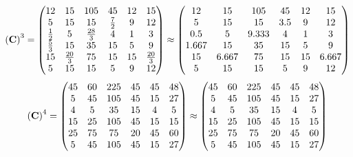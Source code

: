 \documentclass[10pt,a4paper]{article}
\begin{document}
	\[
		\left(\bold{C}\right)^{3} = 
		\begin{pmatrix}
			{{12}} {} & {{15}} {} & {{105}} {} & {{45}} {} & {{12}} {} & {{15}} {} \\
			{{5}} {} & {{15}} {} & {{15}} {} & \frac{{7}} {{2}} & {{9}} {} & {{12}} {} \\
			\frac{1} {{2}} & {{5}} {} & \frac{{28}} {{3}} & {{4}} {} & {1} {} & {{3}} {} \\
			\frac{{5}} {{3}} & {{15}} {} & {{35}} {} & {{15}} {} & {{5}} {} & {{9}} {} \\
			{{15}} {} & \frac{{20}} {{3}} & {{75}} {} & {{15}} {} & {{15}} {} & \frac{{20}} {{3}} \\
			{{5}} {} & {{15}} {} & {{15}} {} & {{5}} {} & {{9}} {} & {{12}} {} \\
		\end{pmatrix}
		\approx
		\begin{pmatrix}
			12       & 15       & 105      & 45       & 12       & 15       \\
			5        & 15       & 15       & 3.5      & 9        & 12       \\
			0.5      & 5        & 9.333    & 4        & 1        & 3        \\
			1.667    & 15       & 35       & 15       & 5        & 9        \\
			15       & 6.667    & 75       & 15       & 15       & 6.667    \\
			5        & 15       & 15       & 5        & 9        & 12       \\
		\end{pmatrix}
	\]
	\[
		\left(\bold{C}\right)^{4} = 
		\begin{pmatrix}
			{{45}} {} & {{60}} {} & {{225}} {} & {{45}} {} & {{45}} {} & {{48}} {} \\
			{{5}} {} & {{45}} {} & {{105}} {} & {{45}} {} & {{15}} {} & {{27}} {} \\
			{{4}} {} & {{5}} {} & {{35}} {} & {{15}} {} & {{4}} {} & {{5}} {} \\
			{{15}} {} & {{25}} {} & {{105}} {} & {{45}} {} & {{15}} {} & {{15}} {} \\
			{{25}} {} & {{75}} {} & {{75}} {} & {{20}} {} & {{45}} {} & {{60}} {} \\
			{{5}} {} & {{45}} {} & {{105}} {} & {{45}} {} & {{15}} {} & {{27}} {} \\
		\end{pmatrix}
		\approx
		\begin{pmatrix}
			45       & 60       & 225      & 45       & 45       & 48       \\
			5        & 45       & 105      & 45       & 15       & 27       \\
			4        & 5        & 35       & 15       & 4        & 5        \\
			15       & 25       & 105      & 45       & 15       & 15       \\
			25       & 75       & 75       & 20       & 45       & 60       \\
			5        & 45       & 105      & 45       & 15       & 27       \\
		\end{pmatrix}
	\]
\end{document}
